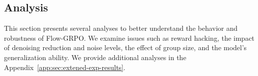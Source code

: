 








\subsection{Analysis}
This section presents several analyses to better understand the behavior and robustness of Flow-GRPO. We examine issues such as reward hacking, the impact of denoising reduction and noise levels, the effect of group size, and the model’s generalization ability. We provide additional analyses in the Appendix~\ref{app:sec:extened-exp-results}.

